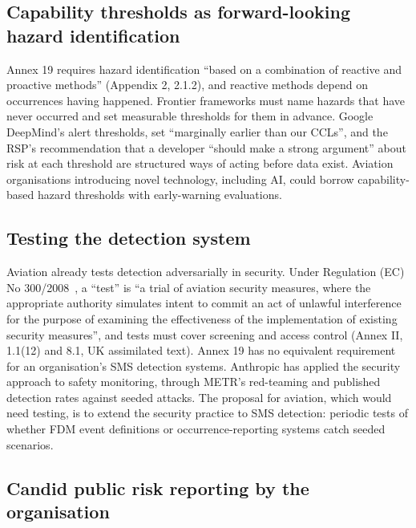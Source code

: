 \documentclass[11pt]{article}
\begin{document}
\subsection{Capability thresholds as forward-looking hazard identification}\label{sec:learn-thresholds}

Annex 19 requires hazard identification ``based on a combination of reactive and proactive methods'' (Appendix 2, 2.1.2), and reactive methods depend on occurrences having happened. Frontier frameworks must name hazards that have never occurred and set measurable thresholds for them in advance. Google DeepMind's alert thresholds, set ``marginally earlier than our CCLs'', and the RSP's recommendation that a developer ``should make a strong argument'' about risk at each threshold are structured ways of acting before data exist. Aviation organisations introducing novel technology, including AI, could borrow capability-based hazard thresholds with early-warning evaluations.

\subsection{Testing the detection system}\label{sec:learn-testing}

Aviation already tests detection adversarially in security. Under Regulation (EC) No 300/2008~\cite{reg2008_300}, a ``test'' is ``a trial of aviation security measures, where the appropriate authority simulates intent to commit an act of unlawful interference for the purpose of examining the effectiveness of the implementation of existing security measures'', and tests must cover screening and access control (Annex II, 1.1(12) and 8.1, UK assimilated text). Annex 19 has no equivalent requirement for an organisation's SMS detection systems. Anthropic has applied the security approach to safety monitoring, through METR's red-teaming and published detection rates against seeded attacks. The proposal for aviation, which would need testing, is to extend the security practice to SMS detection: periodic tests of whether FDM event definitions or occurrence-reporting systems catch seeded scenarios.

\subsection{Candid public risk reporting by the organisation}\label{sec:learn-reporting}
\end{document}
